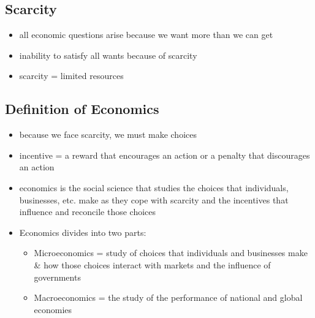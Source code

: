 \documentclass[11pt]{article}
\begin{document}
\subsection{Scarcity}
\label{sec:org017a22e}
\begin{itemize}
\item all economic questions arise because we want more than we can get
\item inability to satisfy all wants because of scarcity
\item scarcity = limited resources
\end{itemize}
\subsection{Definition of Economics}
\label{sec:org094b475}
\begin{itemize}
\item because we face scarcity, we must make choices
\item incentive = a reward that encourages an action or a penalty that discourages an action
\item economics is the social science that studies the choices that individuals, businesses, etc.
make as they cope with scarcity and the incentives that influence and reconcile those choices
\item Economics divides into two parts:
\begin{itemize}
\item Microeconomics = study of choices that individuals and businesses make \& how those choices
interact with markets and the influence of governments
\item Macroeconomics = the study of the performance of national and global economies
\end{itemize}
\end{itemize}
\end{document}
